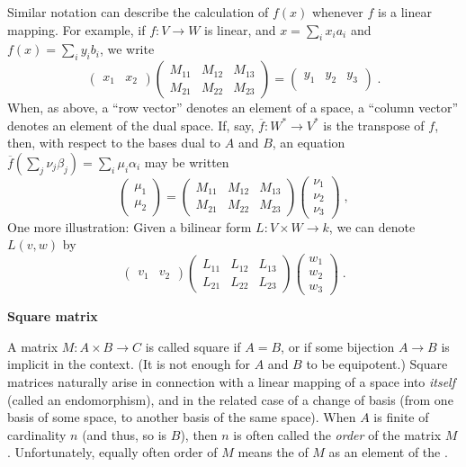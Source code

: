 \documentclass{article}
\begin{document}
Similar notation can describe the calculation of $f(x)$ whenever $f$
is a linear mapping. For example, if $f\colon V\to W$ is linear,
and $x=\sum_ix_ia_i$ and $f(x)=\sum_iy_ib_i$, we write
$$
\begin{pmatrix}
x_1 & x_2
\end{pmatrix}
\begin{pmatrix}
M_{11} & M_{12} & M_{13} \\
M_{21} & M_{22} & M_{23}
\end{pmatrix}
=
\begin{pmatrix}
y_1 & y_2 & y_3 \\
\end{pmatrix}\;.
$$
When, as above, a ``row vector'' denotes an element of a space,
a ``column vector'' denotes an element of the dual space.
If, say, $\overline{f}\colon W^*\to V^*$ is the transpose of $f$,
then, with respect to the bases dual to $A$ and $B$,
an equation $\overline{f}(\sum_j\nu_j\beta_j)=\sum_i\mu_i\alpha_i$
may be written
$$
\begin{pmatrix} \mu_1 \\ \mu_2 \end{pmatrix}
=
\begin{pmatrix}
M_{11} & M_{12} & M_{13} \\
M_{21} & M_{22} & M_{23}
\end{pmatrix}
\begin{pmatrix} \nu_1 \\ \nu_2 \\ \nu_3 \end{pmatrix}\;,
$$
One more illustration: Given a bilinear form $L\colon V\times W\to k$,
we can denote $L(v,w)$ by
$$
\begin{pmatrix} v_1 & v_2 \end{pmatrix}
\begin{pmatrix}
L_{11} & L_{12} & L_{13} \\
L_{21} & L_{22} & L_{23}
\end{pmatrix}
\begin{pmatrix} w_1 \\ w_2 \\ w_3 \end{pmatrix}\;.
$$

\textbf{Square matrix}

A matrix $M\colon A\times B\to C$ is called square if $A=B$, or if some
bijection $A\to B$ is implicit in the context.
(It is not enough for $A$ and $B$ to be equipotent.)
Square matrices naturally arise in connection with a linear mapping of
a space into \emph{itself} (called an endomorphism), and in the related
case of a change of basis (from one basis of some space, to another
basis of the same space).  When $A$ is finite of cardinality $n$ (and thus, so is $B$), then $n$ is often called the \emph{order} of the matrix $M$. Unfortunately, equally often order of $M$ means the  of $M$ as an element of the .
\end{document}
